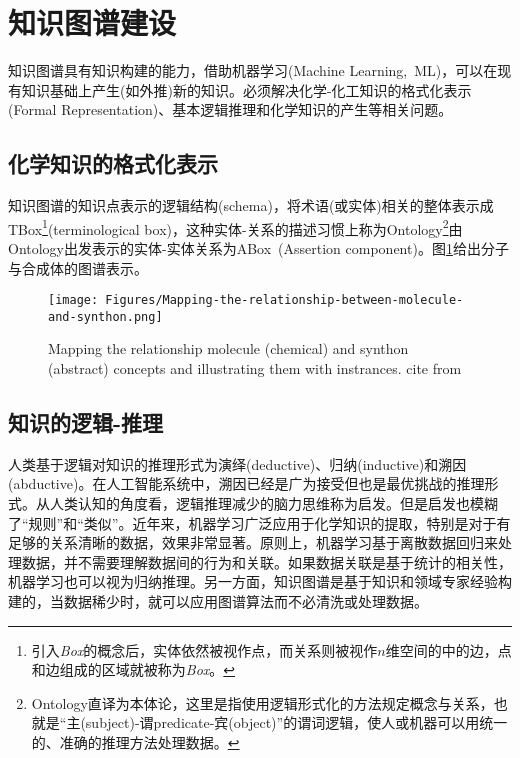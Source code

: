 \section{知识图谱建设}
知识图谱具有知识构建的能力，借助机器学习\textrm{(Machine Learning,~ML)}，可以在现有知识基础上产生(如外推)新的知识。必须解决化学-化工知识的格式化表示\textrm{(Formal Representation)}、基本逻辑推理和化学知识的产生等相关问题。
\subsection{化学知识的格式化表示}
知识图谱的知识点表示的逻辑结构\textrm{(schema)}，将术语(或实体)相关的整体表示成\textrm{TBox}\footnote{引入\textit{Box}的概念后，实体依然被视作点，而关系则被视作$n$维空间的中的边，点和边组成的区域就被称为\textit{Box}。}\textrm{(terminological box)}，这种实体-关系的描述习惯上称为\textrm{Ontology}\footnote{\textrm{Ontology}直译为本体论，这里是指使用逻辑形式化的方法规定概念与关系，也就是“主\textrm{(subject)}-谓\textrm{predicate}-宾\textrm{(object)}”的谓词逻辑，使人或机器可以用统一的、准确的推理方法处理数据。}由\textrm{Ontology}出发表示的实体-实体关系为\textrm{ABox~(Assertion component)}。图\ref{Fig:Mapping-relationship-molecule-synthon}给出分子与合成体的图谱表示。 
\begin{figure}[h!]
\centering
\texttt{[image: Figures/Mapping-the-relationship-between-molecule-and-synthon.png]}
\caption{\small\textrm{Mapping the relationship molecule (chemical) and synthon (abstract) concepts and illustrating them with instrances. cite from\cite{ACR56-128_2023}}}%
\label{Fig:Mapping-relationship-molecule-synthon}
\end{figure}

\subsection{知识的逻辑-推理}
人类基于逻辑对知识的推理形式为演绎\textrm{(deductive)}、归纳\textrm{(inductive)}和溯因\textrm{(abductive)}。在人工智能系统中，溯因已经是广为接受但也是最优挑战的推理形式。从人类认知的角度看，逻辑推理减少的脑力思维称为启发。但是启发也模糊了“规则”和“类似”。近年来，机器学习广泛应用于化学知识的提取，特别是对于有足够的关系清晰的数据，效果非常显著。原则上，机器学习基于离散数据回归来处理数据，并不需要理解数据间的行为和关联。如果数据关联是基于统计的相关性，机器学习也可以视为归纳推理。另一方面，知识图谱是基于知识和领域专家经验构建的，当数据稀少时，就可以应用图谱算法而不必清洗或处理数据。

